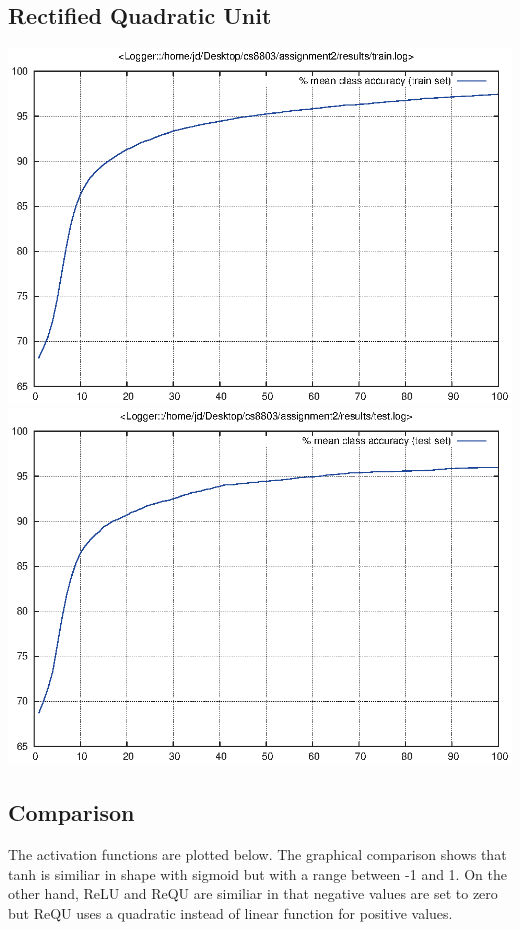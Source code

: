 \documentclass[twoside,12pt]{article}
\newcommand{\imsize}{0.5\linewidth}
\begin{document}
\subsection{Rectified Quadratic Unit}
\includegraphics[width=\imsize]{assignment2/results/requ_train}
\includegraphics[width=\imsize]{assignment2/results/requ_test}

\subsection{Comparison}

The activation functions are plotted below. The graphical comparison shows that tanh is similiar in shape with sigmoid
but with a range between -1 and 1. On the other hand, ReLU and ReQU are similiar in that negative values are set to zero
but ReQU uses a quadratic instead of linear function for positive values.
\end{document}
